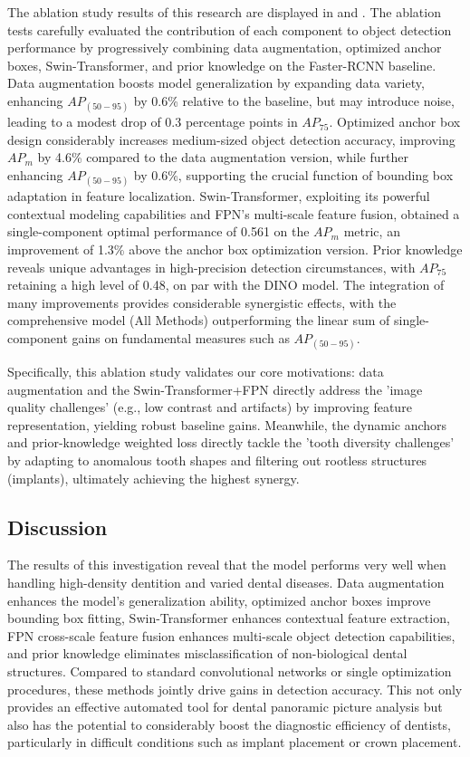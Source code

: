 \documentclass[pdflatex,sn-mathphys-num]{sn-jnl}%
\theoremstyle{thmstyleone}%
\theoremstyle{thmstyletwo}%
\theoremstyle{thmstylethree}%
\begin{document}
The ablation study results of this research are displayed in  and .  The ablation tests carefully evaluated the contribution of each component to object detection performance by progressively combining data augmentation, optimized anchor boxes, Swin-Transformer, and prior knowledge on the Faster-RCNN baseline.  Data augmentation boosts model generalization by expanding data variety, enhancing $AP_{(50-95)}$ by 0.6\% relative to the baseline, but may introduce noise, leading to a modest drop of 0.3 percentage points in $AP_{75}$.  Optimized anchor box design considerably increases medium-sized object detection accuracy, improving $AP_m$ by 4.6\% compared to the data augmentation version, while further enhancing $AP_{(50-95)}$ by 0.6\%, supporting the crucial function of bounding box adaptation in feature localization.  Swin-Transformer, exploiting its powerful contextual modeling capabilities and FPN's multi-scale feature fusion, obtained a single-component optimal performance of 0.561 on the $AP_m$ metric, an improvement of 1.3\% above the anchor box optimization version.  Prior knowledge reveals unique advantages in high-precision detection circumstances, with $AP_{75}$ retaining a high level of 0.48, on par with the DINO model.  The integration of many improvements provides considerable synergistic effects, with the comprehensive model (All Methods) outperforming the linear sum of single-component gains on fundamental measures such as $AP_{(50-95)}$.

Specifically, this ablation study validates our core motivations: data augmentation and the Swin-Transformer+FPN directly address the 'image quality challenges' (e.g., low contrast and artifacts) by improving feature representation, yielding robust baseline gains. Meanwhile, the dynamic anchors and prior-knowledge weighted loss directly tackle the 'tooth diversity challenges' by adapting to anomalous tooth shapes and filtering out rootless structures (implants), ultimately achieving the highest synergy.

\subsection{Discussion}

The results of this investigation reveal that the model performs very well when handling high-density dentition and varied dental diseases.  Data augmentation enhances the model's generalization ability, optimized anchor boxes improve bounding box fitting, Swin-Transformer enhances contextual feature extraction, FPN cross-scale feature fusion enhances multi-scale object detection capabilities, and prior knowledge eliminates misclassification of non-biological dental structures.  Compared to standard convolutional networks or single optimization procedures, these methods jointly drive gains in detection accuracy.  This not only provides an effective automated tool for dental panoramic picture analysis but also has the potential to considerably boost the diagnostic efficiency of dentists, particularly in difficult conditions such as implant placement or crown placement.
\end{document}
